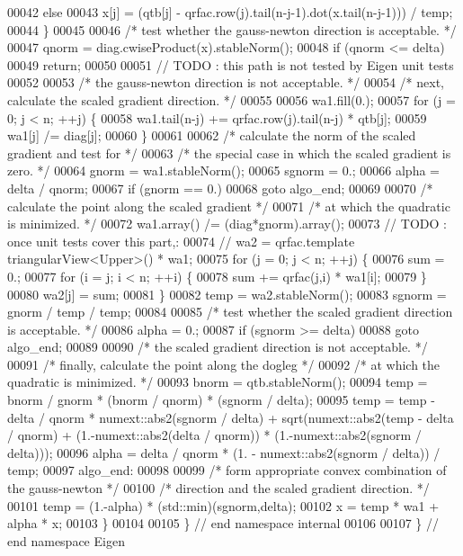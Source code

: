\begin{DoxyCode}
00042         \textcolor{keywordflow}{else}
00043             x[j] = (qtb[j] - qrfac.row(j).tail(n-j-1).dot(x.tail(n-j-1))) / temp;
00044     \}
00045 
00046     \textcolor{comment}{/* test whether the gauss-newton direction is acceptable. */}
00047     qnorm = diag.cwiseProduct(x).stableNorm();
00048     \textcolor{keywordflow}{if} (qnorm <= delta)
00049         \textcolor{keywordflow}{return};
00050 
00051     \textcolor{comment}{// TODO : this path is not tested by Eigen unit tests}
00052 
00053     \textcolor{comment}{/* the gauss-newton direction is not acceptable. */}
00054     \textcolor{comment}{/* next, calculate the scaled gradient direction. */}
00055 
00056     wa1.fill(0.);
00057     \textcolor{keywordflow}{for} (j = 0; j < n; ++j) \{
00058         wa1.tail(n-j) += qrfac.row(j).tail(n-j) * qtb[j];
00059         wa1[j] /= diag[j];
00060     \}
00061 
00062     \textcolor{comment}{/* calculate the norm of the scaled gradient and test for */}
00063     \textcolor{comment}{/* the special case in which the scaled gradient is zero. */}
00064     gnorm = wa1.stableNorm();
00065     sgnorm = 0.;
00066     alpha = delta / qnorm;
00067     \textcolor{keywordflow}{if} (gnorm == 0.)
00068         \textcolor{keywordflow}{goto} algo\_end;
00069 
00070     \textcolor{comment}{/* calculate the point along the scaled gradient */}
00071     \textcolor{comment}{/* at which the quadratic is minimized. */}
00072     wa1.array() /= (diag*gnorm).array();
00073     \textcolor{comment}{// TODO : once unit tests cover this part,:}
00074     \textcolor{comment}{// wa2 = qrfac.template triangularView<Upper>() * wa1;}
00075     \textcolor{keywordflow}{for} (j = 0; j < n; ++j) \{
00076         sum = 0.;
00077         \textcolor{keywordflow}{for} (i = j; i < n; ++i) \{
00078             sum += qrfac(j,i) * wa1[i];
00079         \}
00080         wa2[j] = sum;
00081     \}
00082     temp = wa2.stableNorm();
00083     sgnorm = gnorm / temp / temp;
00084 
00085     \textcolor{comment}{/* test whether the scaled gradient direction is acceptable. */}
00086     alpha = 0.;
00087     \textcolor{keywordflow}{if} (sgnorm >= delta)
00088         \textcolor{keywordflow}{goto} algo\_end;
00089 
00090     \textcolor{comment}{/* the scaled gradient direction is not acceptable. */}
00091     \textcolor{comment}{/* finally, calculate the point along the dogleg */}
00092     \textcolor{comment}{/* at which the quadratic is minimized. */}
00093     bnorm = qtb.stableNorm();
00094     temp = bnorm / gnorm * (bnorm / qnorm) * (sgnorm / delta);
00095     temp = temp - delta / qnorm * numext::abs2(sgnorm / delta) + sqrt(numext::abs2(temp - delta / qnorm) + 
      (1.-numext::abs2(delta / qnorm)) * (1.-numext::abs2(sgnorm / delta)));
00096     alpha = delta / qnorm * (1. - numext::abs2(sgnorm / delta)) / temp;
00097 algo\_end:
00098 
00099     \textcolor{comment}{/* form appropriate convex combination of the gauss-newton */}
00100     \textcolor{comment}{/* direction and the scaled gradient direction. */}
00101     temp = (1.-alpha) * (std::min)(sgnorm,delta);
00102     x = temp * wa1 + alpha * x;
00103 \}
00104 
00105 \} \textcolor{comment}{// end namespace internal}
00106 
00107 \} \textcolor{comment}{// end namespace Eigen}
\end{DoxyCode}
